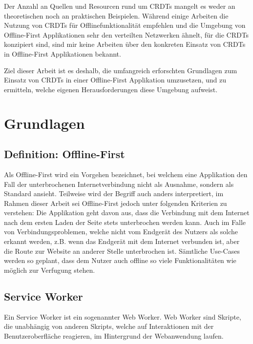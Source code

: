 \documentclass[a4paper, 12pt]{scrreprt}
\begin{document}
Der Anzahl an Quellen und Resourcen rund um CRDTs mangelt es weder an theoretischen noch an praktischen Beispielen. Während einige Arbeiten die Nutzung von CRDTs für Offlinefunktionalität empfehlen und die Umgebung von Offline-First Applikationen sehr den verteilten Netzwerken ähnelt, für die CRDTs konzipiert sind, sind mir keine Arbeiten über den konkreten Einsatz von CRDTs in Offline-First Applikationen bekannt.

Ziel dieser Arbeit ist es deshalb, die umfangreich erforschten Grundlagen zum Einsatz von CRDTs in einer Offline-First Applikation umzusetzen, und zu ermitteln, welche eigenen Herausforderungen diese Umgebung aufweist.
\chapter{Grundlagen}
\section{Definition: Offline-First}\label{sec:DefinitionOfflineFirst}
Als Offline-First wird ein Vorgehen bezeichnet, bei welchem eine Applikation den Fall der unterbrochenen Internetverbindung nicht als Ausnahme, sondern als Standard ansieht. Teilweise wird der Begriff auch anders interpretiert, im Rahmen dieser Arbeit sei Offline-First jedoch unter folgenden Kriterien zu verstehen: Die Applikation geht davon aus, dass die Verbindung mit dem Internet nach dem ersten Laden der Seite stets unterbrochen werden kann. Auch im Falle von Verbindungsproblemen, welche nicht vom Endgerät des Nutzers als solche erkannt werden, z.B. wenn das Endgerät mit dem Internet verbunden ist, aber die Route zur Website an anderer Stelle unterbrochen ist. Sämtliche Use-Cases werden so geplant, dass dem Nutzer auch offline so viele Funktionalitäten wie möglich zur Verfugung stehen.



\section{Service Worker}
Ein Service Worker ist ein sogenannter Web Worker. Web Worker sind Skripte, die unabhängig von anderen Skripts, welche auf Interaktionen mit der Benutzeroberfläche reagieren, im Hintergrund der Webanwendung laufen\autocite{OnlineHTTPWorker}.
\end{document}
